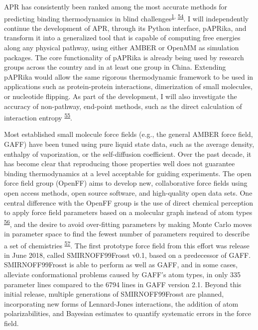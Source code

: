 \documentclass[11pt,notitlepage]{article}
\providecommand{\DIFaddbegin}{} %
\providecommand{\DIFaddend}{} %
\providecommand{\DIFdelbegin}{} %
\providecommand{\DIFdelend}{} %
\newcommand{\DIFscaledelfig}{0.5}
\newlength{\DIFdelgraphicswidth} %
\newlength{\DIFdelgraphicsheight} %
\newcommand{\DIFaddincludegraphics}[2][]{{\color{blue}\fbox{\DIFOincludegraphics[#1]{#2}}}} %
\newcommand{\DIFdelincludegraphics}[2][]{%
\sbox{\DIFdelgraphicsbox}{\DIFOincludegraphics[#1]{#2}}%
\settoboxwidth{\DIFdelgraphicswidth}{\DIFdelgraphicsbox} %
\settoboxtotalheight{\DIFdelgraphicsheight}{\DIFdelgraphicsbox} %
\scalebox{\DIFscaledelfig}{%
\parbox[b]{\DIFdelgraphicswidth}{\usebox{\DIFdelgraphicsbox}\\[-\baselineskip] \rule{\DIFdelgraphicswidth}{0em}}\llap{\resizebox{\DIFdelgraphicswidth}{\DIFdelgraphicsheight}{%
\setlength{\unitlength}{\DIFdelgraphicswidth}%
\begin{picture}(1,1)%
\thicklines\linethickness{2pt} %
{\color[rgb]{1,0,0}\put(0,0){\framebox(1,1){}}}%
{\color[rgb]{1,0,0}\put(0,0){\line( 1,1){1}}}%
{\color[rgb]{1,0,0}\put(0,1){\line(1,-1){1}}}%
\end{picture}%
}\hspace*{3pt}}} %
} %
\DeclareRobustCommand{\DIFaddbegin}{\DIFOaddbegin \let\includegraphics\DIFaddincludegraphics} %
\DeclareRobustCommand{\DIFaddend}{\DIFOaddend \let\includegraphics\DIFOincludegraphics} %
\DeclareRobustCommand{\DIFdelbegin}{\DIFOdelbegin \let\includegraphics\DIFdelincludegraphics} %
\DeclareRobustCommand{\DIFdelend}{\DIFOaddend \let\includegraphics\DIFOincludegraphics} %
\begin{document}
APR has consistently been ranked among the most accurate methods for
predicting binding thermodynamics in blind
challenges\textsuperscript{\protect\hyperlink{ref-BGsUYQln}{1},\protect\DIFdelbegin %
\DIFdelend \DIFaddbegin \hyperlink{ref-GA1AFcUw}{54}\DIFaddend }.
I will independently continue the development of APR, through its Python
interface, pAPRika, and transform it into a generalized tool that is
capable of computing free energies along any physical pathway, using
either AMBER or OpenMM as simulation packages. The core functionality of
pAPRika is already being used by research groups across the country and
in at least one group in China. Extending pAPRika would allow the same
rigorous thermodynamic framework to be used in applications such as
protein-protein interactions, dimerization of small molecules, or
nucleotide flipping. As part of the development, I will also investigate
the accuracy of non-pathway, end-point methods, such as the direct
calculation of interaction
entropy\textsuperscript{\protect\DIFdelbegin %
\DIFdelend \DIFaddbegin \hyperlink{ref-gRfhPG7N}{55}\DIFaddend }.

Most established small molecule force fields (e.g., the general AMBER
force field, GAFF) have been tuned using pure liquid state data, such as
the average density, enthalpy of vaporization, or the self-diffusion
coefficient. Over the past decade, it has become clear that reproducing
those properties well does not guarantee binding thermodynamics at a
level acceptable for guiding experiments. The open force field group
(OpenFF) aims to develop new, collaborative force fields using open
access methods, open source software, and high-quality open data sets.
One central difference with the OpenFF group is the use of direct
chemical perception to apply force field parameters based on a molecular
graph instead of atom
types\textsuperscript{\protect\DIFdelbegin %
\DIFdelend \DIFaddbegin \hyperlink{ref-HlBr7NrU}{56}\DIFaddend }, and the
desire to avoid over-fitting parameters by making Monte Carlo moves in
parameter space to find the fewest number of parameters required to
describe a set of
chemistries\textsuperscript{\protect\DIFdelbegin %
\DIFdelend \DIFaddbegin \hyperlink{ref-13lTSBgHy}{57}\DIFaddend }. The
first prototype force field from this effort was release in June 2018,
called SMIRNOFF99Frosst v0.1, based on a predecessor of GAFF.
SMIRNOFF99Frosst is able to perform as well as GAFF, and in some cases,
alleviate conformational problems caused by GAFF's atom types, in only
335 parameter lines compared to the 6794 lines in GAFF version 2.1.
Beyond this initial release, multiple generations of SMIRNOFF99Frosst
are planned, incorporating new forms of Lennard-Jones interactions, the
addition of atom polarizabilities, and Bayesian estimates to quantify
systematic errors in the force field.
\end{document}
